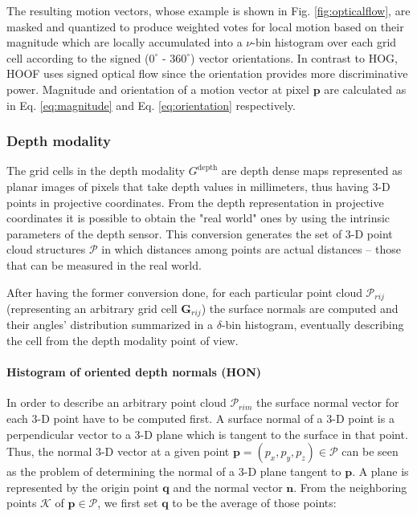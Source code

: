 \documentclass[10pt,twocolumn,letterpaper]{article}
\begin{document}
 The resulting motion vectors, whose example is shown in Fig. \ref{fig:opticalflow}, are masked and quantized to produce weighted votes for local motion based on their magnitude which are locally accumulated into a $\nu$-bin histogram over each grid cell according to the signed ($0^\circ$ - $360^\circ$) vector orientations. In contrast to HOG, HOOF uses signed optical flow since the orientation provides more discriminative power. Magnitude and orientation of a motion vector at pixel $\mathbf{p}$ are calculated as in Eq. \ref{eq:magnitude} and Eq. \ref{eq:orientation} respectively.

\subsubsection{Depth modality}
\label{sssec:depth}

The grid cells in the depth modality $G^\mathrm{depth}$ are depth dense maps represented as planar images of pixels that take depth values in millimeters, thus having 3-D points in projective coordinates. From the depth representation in projective coordinates it is possible to obtain the "real world" ones by using the intrinsic parameters of the depth sensor. This conversion generates the set of 3-D point cloud structures $\mathcal{P}$ in which distances among points are actual distances -- those that can be measured in the real world. 

After having the former conversion done, for each particular point cloud $\mathcal{P}_{rij}$ (representing an arbitrary grid cell $\mathbf{G}_{rij}$) the surface normals are computed and their angles' distribution summarized in a $\delta$-bin histogram, eventually describing the cell from the depth modality point of view.

\paragraph{Histogram of oriented depth normals (HON)} 
In order to describe an arbitrary point cloud $\mathcal{P}_{rim}$ the surface normal vector for each 3-D point have to be computed first. A surface normal of a 3-D point is a perpendicular vector to a 3-D plane which is tangent to the surface in that point. Thus, the normal 3-D vector at a given point $\mathbf{p} = (p_x, p_y, p_z) \in \mathcal{P}$ can be seen as the problem of determining the normal of a 3-D plane tangent to $\mathbf{p}$. A plane is represented by the origin point $\mathbf{q}$ and the normal vector $\mathbf{n}$. From the neighboring points $\mathcal{K}$ of $\mathbf{p} \in \mathcal{P}$, we first set $\mathbf{q}$ to be the average of those points:
\end{document}
